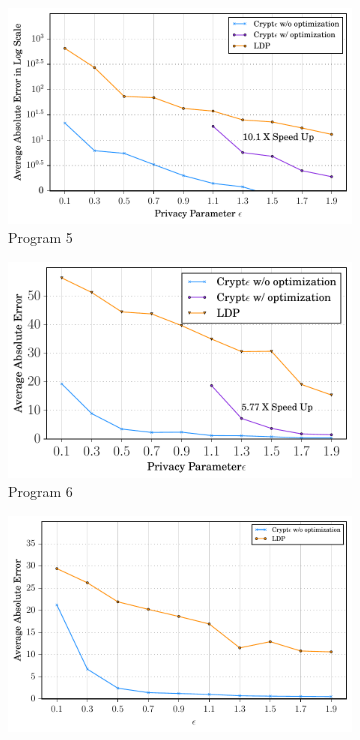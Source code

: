 \begin{figure}[ht]
          \begin{subfigure}[b]{0.25\linewidth}
    \centering    \includegraphics[width=1\linewidth]{t5.pdf}
        \caption{Program 5}
        \label{fig:mouse}\end{subfigure}%
          \begin{subfigure}[b]{0.25\linewidth}
    \centering  \includegraphics[width=1\linewidth]{t6.pdf}
        \caption{Program 6}
        \label{fig:mouse}\end{subfigure}%
          \begin{subfigure}[b]{0.25\linewidth}
    \centering    \includegraphics[width=1\linewidth]{test7.pdf}

\end{subfigure}
\end{figure}
